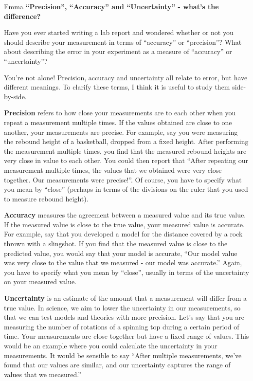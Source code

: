\begin{studentOpinion}{Emma}
\textbf{``Precision'', ``Accuracy'' and ``Uncertainty'' - what's the difference?}

Have you ever started writing a lab report and wondered whether or not you should describe your measurement in terms of ``accuracy'' or ``precision''? What about describing the error in your experiment as a measure of ``accuracy'' or ``uncertainty''? 

You're not alone! Precision, accuracy and uncertainty all relate to error, but have different meanings. To clarify these terms, I think it is useful to study them side-by-side.

\textbf{Precision} refers to how close your measurements are to each other when you repeat a measurement multiple times. If the values obtained are close to one another, your measurements are precise. For example, say you were measuring the rebound height of a basketball, dropped from a fixed height. After performing the measurement multiple times, you find that the measured rebound heights are very close in value to each other. You could then report that ``After repeating our measurement multiple times, the values that we obtained were very close together. Our measurements were precise!''. Of course, you have to specify what you mean by ``close'' (perhaps in terms of the divisions on the ruler that you used to measure rebound height).

\textbf{Accuracy} measures the agreement between a measured value and its true value. If the measured value is close to the true value, your measured value is accurate. For example, say that you developed a model for the distance covered by a rock thrown with a slingshot. If you find that the measured value is close to the predicted value, you would say that your model is accurate, ``Our model value was very close to the value that we measured - our model was accurate.'' Again, you have to specify what you mean by ``close'', usually in terms of the uncertainty on your measured value.

\textbf{Uncertainty} is an estimate of the amount that a measurement will differ from a true value. In science, we aim to lower the uncertainty in our measurements, so that we can test models and theories with more precision. Let's say that you are measuring the number of rotations of a spinning top during a certain period of time. Your measurements are close together but have a fixed range of values. This would be an example where you could calculate the uncertainty in your measurements. It would be sensible to say ``After multiple measurements, we've found that our values are similar, and our uncertainty captures the range of values that we measured.''

\end{studentOpinion}


